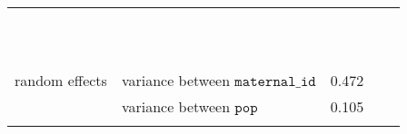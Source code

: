 \begin{table}[H]
\begin{tabular}[t]{>{\raggedright\arraybackslash}p{3cm}>{\raggedright\arraybackslash}p{5cm}rrr}
\cellcolor{gray!6}{} & \cellcolor{gray!6}{$\beta_{\mathtt{age}^4\times\mathtt{parity}}$} & \cellcolor{gray!6}{-3263} & \cellcolor{gray!6}{6416} & \cellcolor{gray!6}{-0.509}\\
\cellcolor{gray!6}{} & \cellcolor{gray!6}{$\beta_{\mathtt{parity}^2}$} & \cellcolor{gray!6}{-19.8} & \cellcolor{gray!6}{105} & \cellcolor{gray!6}{-0.188}\\
\cellcolor{gray!6}{} & \cellcolor{gray!6}{$\beta_{\mathtt{age}\times\mathtt{parity}^2}$} & \cellcolor{gray!6}{24157} & \cellcolor{gray!6}{38317} & \cellcolor{gray!6}{0.63}\\
\cellcolor{gray!6}{} & \cellcolor{gray!6}{$\beta_{\mathtt{age}^2\times\mathtt{parity}^2}$} & \cellcolor{gray!6}{-6236} & \cellcolor{gray!6}{22842} & \cellcolor{gray!6}{-0.273}\\
\cellcolor{gray!6}{} & \cellcolor{gray!6}{$\beta_{\mathtt{age}^3\times\mathtt{parity}^2}$} & \cellcolor{gray!6}{10729} & \cellcolor{gray!6}{8894} & \cellcolor{gray!6}{1.21}\\
\cellcolor{gray!6}{} & \cellcolor{gray!6}{$\beta_{\mathtt{parity}^3}$} & \cellcolor{gray!6}{25.9} & \cellcolor{gray!6}{64.7} & \cellcolor{gray!6}{0.4}\\
\cellcolor{gray!6}{} & \cellcolor{gray!6}{$\beta_{\mathtt{age}\times\mathtt{parity}^3}$} & \cellcolor{gray!6}{-15049} & \cellcolor{gray!6}{19092} & \cellcolor{gray!6}{-0.788}\\
\cellcolor{gray!6}{} & \cellcolor{gray!6}{$\beta_{\mathtt{age}^2\times\mathtt{parity}^3}$} & \cellcolor{gray!6}{1073} & \cellcolor{gray!6}{8613} & \cellcolor{gray!6}{0.125}\\
\cellcolor{gray!6}{} & \cellcolor{gray!6}{$\beta_{\mathtt{parity}^4}$} & \cellcolor{gray!6}{24} & \cellcolor{gray!6}{21.4} & \cellcolor{gray!6}{1.12}\\
\cellcolor{gray!6}{} & \cellcolor{gray!6}{$\beta_{\mathtt{age}\times\mathtt{parity}^4}$} & \cellcolor{gray!6}{-1749} & \cellcolor{gray!6}{5030} & \cellcolor{gray!6}{-0.348}\\
\cellcolor{gray!6}{} & \cellcolor{gray!6}{$\beta_{\mathtt{parity}^5}$} & \cellcolor{gray!6}{-4.66} & \cellcolor{gray!6}{4.84} & \cellcolor{gray!6}{-0.962}\\
random effects & variance between $\mathtt{maternal\_id}$ & 0.472 &  & \\
 & variance between $\mathtt{pop}$ & 0.105 &  & \\
\cellcolor{gray!6}{response family} & \cellcolor{gray!6}{binomial with logit link} & \cellcolor{gray!6}{} & \cellcolor{gray!6}{} & \cellcolor{gray!6}{}\\

\end{tabular}
\end{table}
